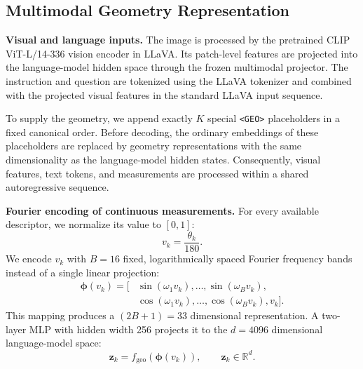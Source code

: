 \documentclass[conference]{IEEEtran}
\begin{document}
\subsection{Multimodal Geometry Representation}
\label{sec:geometry_representation}

\noindent\textbf{Visual and language inputs.}
The image is processed by the pretrained CLIP ViT-L/14-336 vision encoder in LLaVA.
Its patch-level features are projected into the language-model hidden space through the frozen multimodal projector.
The instruction and question are tokenized using the LLaVA tokenizer and combined with the projected visual features in the standard LLaVA input sequence.

To supply the geometry, we append exactly $K$ special \texttt{<GEO>} placeholders in a fixed canonical order.
Before decoding, the ordinary embeddings of these placeholders are replaced by geometry representations with the same dimensionality as the language-model hidden states.
Consequently, visual features, text tokens, and measurements are processed within a shared autoregressive sequence.

\noindent\textbf{Fourier encoding of continuous measurements.}
For every available descriptor, we normalize its value to $[0,1]$:
\begin{equation}
    v_k=\frac{\theta_k}{180}.
    \label{eq:angle_normalization}
\end{equation}
We encode $v_k$ with $B=16$ fixed, logarithmically spaced Fourier frequency bands instead of a single linear projection:
\begin{equation}
\begin{split}
    \boldsymbol{\phi}(v_k)=\big[
        &\sin(\omega_1v_k),\ldots,\sin(\omega_Bv_k),\\
        &\cos(\omega_1v_k),\ldots,\cos(\omega_Bv_k),v_k
    \big].
\end{split}
\label{eq:fourier_features}
\end{equation}
This mapping produces a $(2B+1)=33$ dimensional representation.
A two-layer MLP with hidden width 256 projects it to the $d=4096$ dimensional language-model space:
\begin{equation}
    \mathbf{z}_k
    =f_{\mathrm{geo}}\!\left(\boldsymbol{\phi}(v_k)\right),
    \qquad \mathbf{z}_k\in\mathbb{R}^{d}.
    \label{eq:scalar_projection}
\end{equation}
\end{document}
